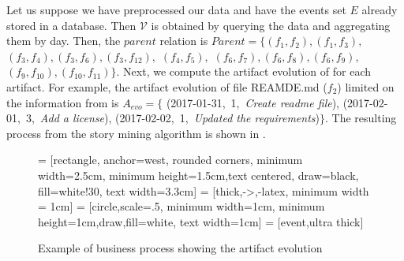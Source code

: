 Let us suppose we have preprocessed our data and have the events  set $E$ already stored in a database. Then $\mathcal{V}$ is obtained by querying the data and aggregating them by day. Then, the $parent$ relation is $Parent = \{(f_1,f_2), (f_1,f_3),$ $(f_3,f_4), (f_3,f_6), (f_3,f_{12}),$
$(f_4,f_5),$
$(f_6,f_{7}),(f_6,f_{8}),(f_6,f_{9}),$
$ (f_9,f_{10}), (f_{10},f_{11}) \}$. 
Next, we compute the artifact evolution of for each artifact. For example, the artifact evolution of file REAMDE.md
($f_2$) limited on the information from  is $A_{evo} = \{$
	(2017-01-31,~1,~\emph{Create readme file}),
	(2017-02-01,~3,~\emph{Add a license}),
	(2017-02-02,~1,~\emph{Updated the requirements})$\}$.
The resulting process from the story mining algorithm is shown in .
\begin{figure}
	\usetikzlibrary{positioning, calc}
	 = [rectangle, anchor=west, rounded corners, minimum width=2.5cm, minimum height=1.5cm,text centered, draw=black, fill=white!30, text width=3.3cm]
	 = [thick,->,-latex, minimum width = 1cm]
	 = [circle,scale=.5, minimum width=1cm, minimum height=1cm,draw,fill=white, text width=1cm]
	 = [event,ultra thick]
	\centering
	\caption{Example of business process showing the artifact evolution}
	\label{fig:readme-process-example}
\end{figure}

